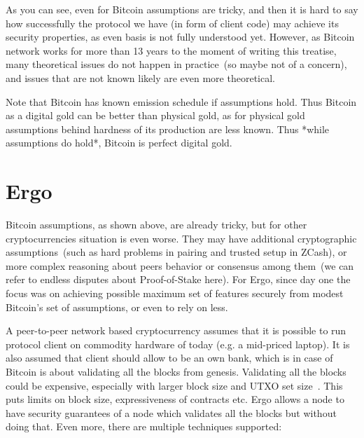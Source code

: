 \documentclass{article}   %
\newcommand{\authnote}[2]{\marginpar{\parbox{\marginparwidth}{\tiny %
  \textsf{#1 {\textcolor{blue}{notes: #2}}}}}%
  \textcolor{blue}{\textbf{\dag}}}
\newcommand{\authnote}[2]{
  \textsf{#1 \textcolor{blue}{: #2}}}
\newcommand{\authnote}[2]{}
\newcommand{\knote}[1]{{\authnote{\textcolor{green}{Alex notes}}{#1}}}
\begin{document}
As you can see, even for Bitcoin assumptions are tricky, and then it is hard to say how successfully the protocol we have (in form of client code) may achieve its security properties, as even basis is not fully understood yet. However, as Bitcoin network works for more than 13 years to the moment of writing this treatise, many theoretical issues do not happen in practice~(so maybe not of a concern), and issues that are not known likely are even more theoretical.

Note that Bitcoin has known emission schedule if assumptions hold. Thus Bitcoin as a digital gold can be better than physical gold, as for physical gold assumptions behind hardness of its production are less known. Thus *while assumptions do hold*, Bitcoin is perfect digital gold.

\knote{fun facts, e.g. Bitcoin protocol is the code, but originally the code had unlimited emission.} 

\section{Ergo}

Bitcoin assumptions, as shown above, are already tricky, but for other cryptocurrencies situation is even worse. They may have additional cryptographic assumptions~(such as hard problems in pairing and trusted setup in ZCash), or more complex reasoning about peers behavior or consensus among them~(we can refer to endless disputes about Proof-of-Stake here). For Ergo, since day one the focus was on achieving possible maximum set of features securely from modest Bitcoin's set of assumptions, or even to rely on less. 

A peer-to-peer network based cryptocurrency assumes that it is possible to run protocol client on commodity hardware of today (e.g. a mid-priced laptop). It is also assumed that client should allow to be an own bank, which is in case of Bitcoin is about validating all the blocks from genesis. Validating all the blocks could be expensive, especially with larger block size and UTXO set size~\cite{UtxoOhUh}. This puts limits on block size, expressiveness of contracts etc. Ergo allows a node to have security guarantees of a node which validates all the blocks but without 
doing that. Even more, there are multiple techniques supported: 
\end{document}
